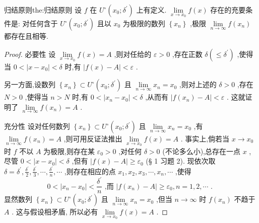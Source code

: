 \begin{theorem}{归结原则}{the:归结原则}
设 \(f\) 在 \({U}^{ \circ  }\left( {{x}_{0};{\delta }^{\prime }}\right)\) 上有定义. \(\mathop{\lim }\limits_{{x \rightarrow  {x}_{0}}}f\left( x\right)\) 存在的充要条件是: 对任何含于 \({U}^{ \circ  }\left( {{x}_{0};{\delta }^{\prime }}\right)\) 且以 \({x}_{0}\) 为极限的数列 \(\left\{  {x}_{n}\right\}\) ,极限 \(\mathop{\lim }\limits_{{n \rightarrow  \infty }}f\left( {x}_{n}\right)\) 都存在且相等.
\end{theorem}

\begin{proof}
必要性 设 \(\mathop{\lim }\limits_{{x \rightarrow  {x}_{0}}}f\left( x\right)  = A\) ,则对任给的 \(\varepsilon  > 0\) ,存在正数 \(\delta \left( { \leq  {\delta }^{\prime }}\right)\) ,使得当 \(0 < \left| {x - {x}_{0}}\right|  < \delta\) 时,有 \(\left| {f\left( x\right)  - A}\right|  < \varepsilon\) .

另一方面,设数列 \(\left\{  {x}_{n}\right\}   \subset  {U}^{ \circ  }\left( {{x}_{0};{\delta }^{\prime }}\right)\) 且 \(\mathop{\lim }\limits_{{n \rightarrow  \infty }}{x}_{n} = {x}_{0}\) ,则对上述的 \(\delta  > 0\) ,存在 \(N > 0\) ,使得当 \(n > N\) 时,有 \(0 < \left| {{x}_{n} - {x}_{0}}\right|  < \delta\) ,从而有 \(\left| {f\left( {x}_{n}\right)  - A}\right|  < \varepsilon\) . 这就证明了 \(\mathop{\lim }\limits_{{n \rightarrow  \infty }}f\left( {x}_{n}\right)  = A\) .

充分性 设对任何数列 \(\left\{  {x}_{n}\right\}   \subset  {U}^{ \circ  }\left( {{x}_{0};{\delta }^{\prime }}\right)\) 且 \(\mathop{\lim }\limits_{{n \rightarrow  \infty }}{x}_{n} = {x}_{0}\) ,有 \(\mathop{\lim }\limits_{{n \rightarrow  \infty }}f\left( {x}_{n}\right)  = A\) ,则可用反证法推出 \(\mathop{\lim }\limits_{{x \rightarrow  {x}_{0}}}f\left( x\right)  = A\) . 事实上,倘若当 \(x \rightarrow  {x}_{0}\) 时 \(f\) 不以 \(A\) 为极限,则存在某 \({\varepsilon }_{0} > 0\) ,对任何 \(\delta  > 0\) (不论多么小),总存在一点 \(x\) ,尽管 \(0 < \left| {x - {x}_{0}}\right|  < \delta\) ,但有 \(\left| {f\left( x\right)  - A}\right|  \geq  {\varepsilon }_{0}\) (§ 1 习题 2). 现依次取 \(\delta  = {\delta }^{\prime },\frac{{\delta }^{\prime }}{2},\frac{{\delta }^{\prime }}{3},\cdots ,\frac{{\delta }^{\prime }}{n},\cdots\) ,则存在相应的点 \({x}_{1},{x}_{2},{x}_{3},\cdots ,{x}_{n},\cdots\) ,使得
\[
0 < \left| {{x}_{n} - {x}_{0}}\right|  < \frac{{\delta }^{\prime }}{n}\text{ ,而 }\left| {f\left( {x}_{n}\right)  - A}\right|  \geq  {\varepsilon }_{0},n = 1,2,\cdots \text{ . }
\]
显然数列 \(\left\{  {x}_{n}\right\}   \subset  {U}^{ \circ  }\left( {{x}_{0};{\delta }^{\prime }}\right)\) 且 \(\mathop{\lim }\limits_{{n \rightarrow  \infty }}{x}_{n} = {x}_{0}\) ,但当 \(n \rightarrow  \infty\) 时 \(f\left( {x}_{n}\right)\) 不趋于 \(A\) . 这与假设相矛盾, 所以必有 \(\mathop{\lim }\limits_{{x \rightarrow  {x}_{0}}}f\left( x\right)  = A\) .
\end{proof}


